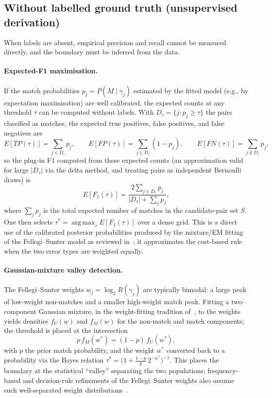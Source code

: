 \documentclass[11pt]{article}
\begin{document}
\subsection{Without labelled ground truth (unsupervised derivation)}
When labels are absent, empirical precision and recall cannot be measured directly, and the boundary must be inferred from the data.

\paragraph{Expected-F1 maximisation.} If the match probabilities $p_j=P(M\mid\gamma_j)$ estimated by the fitted model (e.g., by expectation maximisation) are well calibrated, the expected counts at any threshold $\tau$ can be computed without labels. With $D_\tau=\{j: p_j\ge \tau\}$ the pairs classified as matches, the expected true positives, false positives, and false negatives are
\[
E[TP(\tau)]=\sum_{j\in D_\tau}p_j,\qquad
E[FP(\tau)]=\sum_{j\in D_\tau}(1-p_j),\qquad
E[FN(\tau)]=\sum_{j\notin D_\tau}p_j,
\]
so the plug-in F1 computed from these expected counts (an approximation valid for large $|D_\tau|$ via the delta method, and treating pairs as independent Bernoulli draws) is
\[
E[F_1(\tau)]=\frac{2\sum_{j\in D_\tau}p_j}{|D_\tau|+\sum_{j}p_j},
\]
where $\sum_j p_j$ is the total expected number of matches in the candidate-pair set $S$. One then selects $\tau^*=\operatorname{arg\,max}_\tau E[F_1(\tau)]$ over a dense grid. This is a direct use of the calibrated posterior probabilities produced by the mixture/EM fitting of the Fellegi--Sunter model as reviewed in~\cite{winkler2006}; it approximates the cost-based rule when the two error types are weighted equally.

\paragraph{Gaussian-mixture valley detection.} The Fellegi--Sunter weights $w_j=\log_2 R(\gamma_j)$ are typically bimodal: a large peak of low-weight non-matches and a smaller high-weight match peak. Fitting a two-component Gaussian mixture, in the weight-fitting tradition of~\cite{winkler2006}, to the weights yields densities $f_U(w)$ and $f_M(w)$ for the non-match and match components; the threshold is placed at the intersection
\[
p\, f_M(w^*)=(1-p)\, f_U(w^*),
\]
with $p$ the prior match probability, and the weight $w^*$ converted back to a probability via the Bayes relation $\tau^*=\bigl(1+\frac{1-p}{p}\,2^{-w^*}\bigr)^{-1}$. This places the boundary at the statistical ``valley'' separating the two populations; frequency-based and decision-rule refinements of the Fellegi--Sunter weights also assume such well-separated weight distributions~\cite{winkler2000}.
\end{document}
